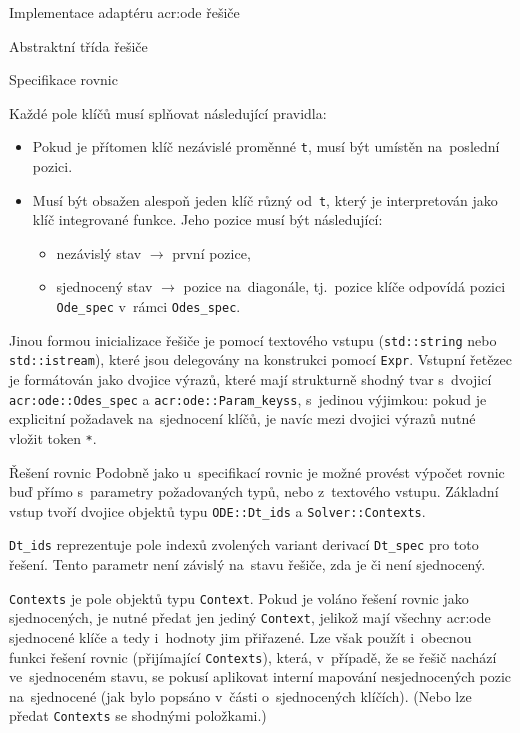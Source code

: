 \documentclass[thesis=M,czech]{FITthesis}[2012/06/26]
\newcommand{\acrlabel}[1]{acr:#1}
\newcommand{\acr}[1]{\acrshort{\acrlabel{#1}}}
\newcommand{\id}[1]{\texttt{#1}}
\begin{document}
\begin{section}{Implementace adaptéru \acr{ode} řešiče}
\begin{subsection}{Abstraktní třída řešiče}
\begin{subsubsection}{Specifikace rovnic}

\bigskip

Každé pole klíčů musí splňovat následující pravidla:
\begin{itemize}
\item Pokud je přítomen klíč nezávislé proměnné \id{t},
   musí být umístěn na~poslední pozici.
\item Musí být obsažen alespoň jeden klíč různý od~\id{t},
   který je interpretován jako klíč integrované funkce.
   Jeho pozice musí být následující:
   \begin{itemize}
   \item nezávislý stav $\rightarrow$ první pozice,
   \item sjednocený stav  $\rightarrow$ pozice na~diagonále,
      tj.~pozice klíče odpovídá pozici \id{Ode\_\-spec}
      v~rámci \id{Odes\_\-spec}.
   \end{itemize}
\end{itemize}

Jinou formou inicializace řešiče
je pomocí textového vstupu
(\id{std::\-string} nebo \id{std::\-istream}),
které jsou delegovány na konstrukci pomocí \id{Expr}.
Vstupní řetězec je formátován jako dvojice výrazů,
které mají strukturně shodný tvar
s~dvojicí \id{\acr{ode}::\-Odes\_\-spec}
a \id{\acr{ode}::\-Param\_\-keyss},
s~jedinou výjimkou: pokud je explicitní požadavek
na~sjednocení klíčů, je navíc mezi dvojici výrazů
nutné vložit token \id{*}.
\end{subsubsection} %


\begin{subsubsection}{Řešení rovnic}\label{sss:impl:ode:solver:solve}
Podobně jako u~specifikací rovnic
je možné provést výpočet rovnic
buď přímo s~parametry požadovaných typů,
nebo z~textového vstupu.
Základní vstup tvoří dvojice objektů
typu \id{ODE::\-Dt\_\-ids} a \id{Solver::\-Contexts}.

\id{Dt\_\-ids} reprezentuje pole indexů
zvolených variant derivací \id{Dt\_\-spec}
pro toto řešení.
Tento parametr není závislý na~stavu řešiče,
zda je či není sjednocený.

\id{Contexts} je pole objektů typu \id{Context}.
Pokud je voláno řešení rovnic jako sjednocených,
je nutné předat jen jediný \id{Context},
jelikož mají všechny \acr{ode} sjednocené klíče
a tedy i~hodnoty jim přiřazené.
Lze však použít i~obecnou funkci řešení rovnic
(přijímající \id{\id{Contexts}}),
která, v~případě, že se řešič nachází ve~sjednoceném stavu,
se pokusí aplikovat interní mapování
nesjednocených pozic na~sjednocené
(jak bylo popsáno v~části o~sjednocených klíčích).
(Nebo lze předat \id{Contexts} se shodnými položkami.)


\end{subsubsection}
\end{subsection}
\end{section}
\end{document}

